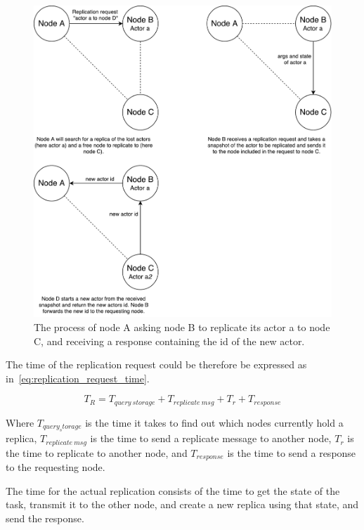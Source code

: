 \documentclass{cslthse-msc}
\begin{document}
\begin{figure}[!hbt]
\centering
\includegraphics[scale=0.5]{images/replication_request.pdf}
\caption{The process of node A asking node B to replicate its actor a to node C, and receiving a response containing the id of the new actor.}\label{fig:replication_request}
\end{figure}

The time of the replication request could be therefore be expressed as in~\cref{eq:replication_request_time}.

\begin{equation} \label{eq:replication_request_time}
T_R = T_{query\ storage} + T_{replicate\ msg} + T_{r} + T_{response}
\end{equation} 

Where $T_{query_storage}$ is the time it takes to find out which nodes currently hold a replica, $T_{replicate\ msg}$ is the time to send a replicate message to another node, $T_{r}$ is the time to replicate to another node, and $T_{response}$ is the time to send a response to the requesting node.

The time for the actual replication consists of the time to get the state of the task, transmit it to the other node, and create a new replica using that state, and send the response.
\end{document}
